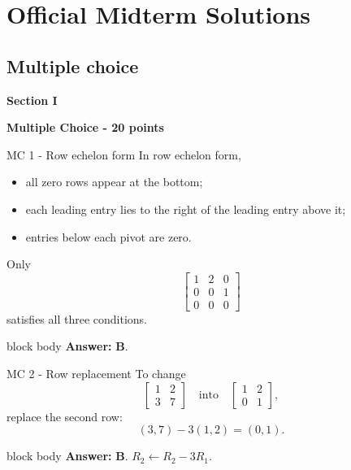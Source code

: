 \documentclass[aspectratio=169]{beamer}
\newcommand{\sectioncard}[2]{%
  \begin{frame}[plain]
    \vfill\centering
    {\Huge\color{lectureorange}\bfseries #1}\par\bigskip
    {\LARGE\color{lecturegreen}\bfseries #2}
    \vfill
  \end{frame}}
\newcommand{\answerbox}[1]{%
  \begin{beamercolorbox}[sep=1.0ex,wd=\linewidth]{block body}
    \textbf{Answer:} #1
  \end{beamercolorbox}}
\begin{document}
\section[Midterm Solutions]{Official Midterm Solutions}


\subsection{Multiple choice}
\sectioncard{Section I}{Multiple Choice - 20 points}

\begin{frame}{MC 1 - Row echelon form}
In row echelon form,
\begin{itemize}
  \item all zero rows appear at the bottom;
  \item each leading entry lies to the right of the leading entry above it;
  \item entries below each pivot are zero.
\end{itemize}
Only
\[
\begin{bmatrix}1&2&0\\0&0&1\\0&0&0\end{bmatrix}
\]
satisfies all three conditions.
\answerbox{\textbf{B}.}
\end{frame}

\begin{frame}{MC 2 - Row replacement}
To change
\[
\begin{bmatrix}1&2\\3&7\end{bmatrix}
\quad\text{into}\quad
\begin{bmatrix}1&2\\0&1\end{bmatrix},
\]
replace the second row:
\[
(3,7)-3(1,2)=(0,1).
\]
\answerbox{\textbf{B}. $R_2\leftarrow R_2-3R_1$.}
\end{frame}
\end{document}
